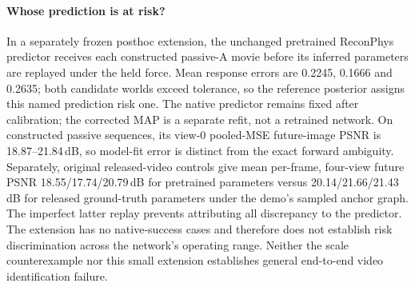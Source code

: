 \paragraph{Whose prediction is at risk?}
In a separately frozen posthoc extension, the unchanged pretrained ReconPhys predictor receives each constructed passive-A movie before its inferred parameters are replayed under the held force. Mean response errors are 0.2245, 0.1666 and 0.2635; both candidate worlds exceed tolerance, so the reference posterior assigns this named prediction risk one. The native predictor remains fixed after calibration; the corrected MAP is a separate refit, not a retrained network. On constructed passive sequences, its view-0 pooled-MSE future-image PSNR is 18.87--21.84\,dB, so model-fit error is distinct from the exact forward ambiguity. Separately, original released-video controls give mean per-frame, four-view future PSNR 18.55/17.74/20.79\,dB for pretrained parameters versus 20.14/21.66/21.43\,dB for released ground-truth parameters under the demo's sampled anchor graph. The imperfect latter replay prevents attributing all discrepancy to the predictor. The extension has no native-success cases and therefore does not establish risk discrimination across the network's operating range. Neither the scale counterexample nor this small extension establishes general end-to-end video identification failure.
